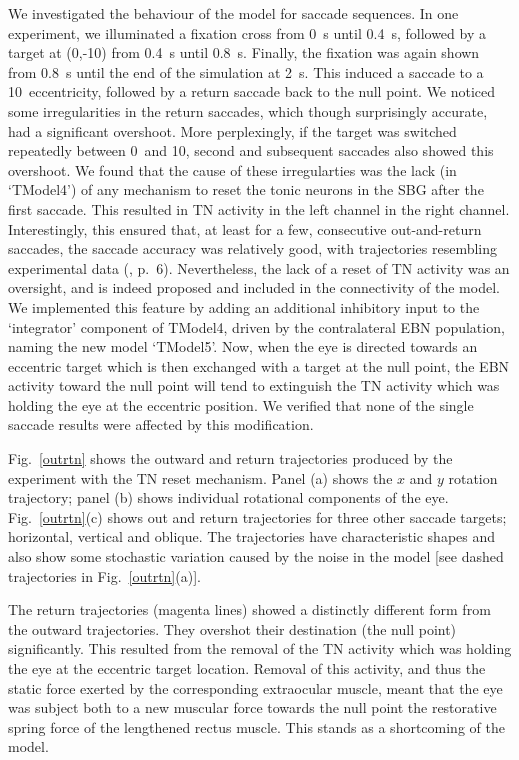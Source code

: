 We investigated the behaviour of the model for saccade sequences.
In one experiment, we illuminated a fixation
cross from 0~s until 0.4~s, followed by a target at (0,-10\dg)
from 0.4~s until 0.8~s. Finally, the fixation was again shown from 0.8~s
until the end of the simulation at 2~s. This induced a saccade to a
10\dg~eccentricity, followed by a return saccade back to the
null point. We noticed some irregularities in the return saccades, which
though surprisingly accurate, had a significant overshoot.
More perplexingly, if the target was switched repeatedly between 0\dg~and
10\dg, second and subsequent  saccades also showed this
overshoot. We found that the cause of these irregularties was the
lack (in `TModel4') of any mechanism to reset the tonic neurons in the
SBG after the first saccade. This resulted in TN activity in the left
channel  in the right channel. Interestingly, this ensured
that, at  least for a few, consecutive out-and-return saccades, the saccade accuracy was
relatively good, with trajectories resembling experimental data
(\cite{bahill_trajectories_1979}, p.~6). %
Nevertheless, the lack of a reset of TN activity was an oversight, and
is indeed proposed and included in the connectivity of the
\cite{gancarz_neural_1998} model. We implemented this feature by adding an
additional inhibitory input to the `integrator' component of TModel4,
driven by the contralateral EBN population, naming the new model `TModel5'.
Now, when the eye is directed towards an eccentric target which is then
exchanged with a target at the null point, the EBN activity toward the
null point will tend to extinguish the TN activity which was holding
the eye at the eccentric position.
We verified that none of the single saccade results were affected
by this modification.

Fig.~\ref{outrtn} shows the
outward and return trajectories produced by the experiment
with the TN reset mechanism. Panel (a)
shows the $x$ and $y$ rotation trajectory; panel (b) shows individual
rotational components of the eye. Fig.~\ref{outrtn}(c) shows
out and return trajectories for three other saccade targets; horizontal,
vertical and oblique. The trajectories have characteristic shapes and
also show some stochastic variation caused by the noise in the model [see
dashed trajectories in Fig.~\ref{outrtn}(a)].

The return trajectories (magenta lines) showed a
distinctly different form from the outward trajectories. They overshot
their destination (the null point) significantly. This resulted from the
removal of the TN activity which was holding the eye at the eccentric
target location. Removal of this activity, and thus the static force
exerted by the corresponding extraocular muscle, meant that the eye
was subject both to a new muscular force towards the null point
 the restorative spring force of the lengthened rectus
muscle. This stands as a shortcoming of the model.

